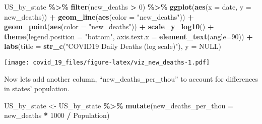 \documentclass[
]{article}
\newenvironment{Shaded}{\begin{snugshade}}{\end{snugshade}}
\newcommand{\AttributeTok}[1]{\textcolor[rgb]{0.13,0.29,0.53}{#1}}
\newcommand{\ConstantTok}[1]{\textcolor[rgb]{0.56,0.35,0.01}{#1}}
\newcommand{\DecValTok}[1]{\textcolor[rgb]{0.00,0.00,0.81}{#1}}
\newcommand{\FunctionTok}[1]{\textcolor[rgb]{0.13,0.29,0.53}{\textbf{#1}}}
\newcommand{\NormalTok}[1]{#1}
\newcommand{\OtherTok}[1]{\textcolor[rgb]{0.56,0.35,0.01}{#1}}
\newcommand{\SpecialCharTok}[1]{\textcolor[rgb]{0.81,0.36,0.00}{\textbf{#1}}}
\newcommand{\StringTok}[1]{\textcolor[rgb]{0.31,0.60,0.02}{#1}}
\begin{document}
\begin{Shaded}
\begin{Highlighting}[]
\NormalTok{US\_by\_state }\SpecialCharTok{\%\textgreater{}\%}
  \FunctionTok{filter}\NormalTok{(new\_deaths }\SpecialCharTok{\textgreater{}} \DecValTok{0}\NormalTok{) }\SpecialCharTok{\%\textgreater{}\%}
  \FunctionTok{ggplot}\NormalTok{(}\FunctionTok{aes}\NormalTok{(}\AttributeTok{x =}\NormalTok{ date, }\AttributeTok{y =}\NormalTok{ new\_deaths)) }\SpecialCharTok{+}
  \FunctionTok{geom\_line}\NormalTok{(}\FunctionTok{aes}\NormalTok{(}\AttributeTok{color =} \StringTok{"new\_deaths"}\NormalTok{)) }\SpecialCharTok{+}
  \FunctionTok{geom\_point}\NormalTok{(}\FunctionTok{aes}\NormalTok{(}\AttributeTok{color =} \StringTok{"new\_deaths"}\NormalTok{)) }\SpecialCharTok{+}
  \FunctionTok{scale\_y\_log10}\NormalTok{() }\SpecialCharTok{+}
  \FunctionTok{theme}\NormalTok{(}\AttributeTok{legend.position =} \StringTok{"bottom"}\NormalTok{, }\AttributeTok{axis.text.x =} \FunctionTok{element\_text}\NormalTok{(}\AttributeTok{angle=}\DecValTok{90}\NormalTok{)) }\SpecialCharTok{+}
  \FunctionTok{labs}\NormalTok{(}\AttributeTok{title =} \FunctionTok{str\_c}\NormalTok{(}\StringTok{"COVID19 Daily Deaths (log scale)"}\NormalTok{), }\AttributeTok{y =} \ConstantTok{NULL}\NormalTok{)}
\end{Highlighting}
\end{Shaded}

\texttt{[image: covid\_19\_files/figure-latex/viz\_new\_deaths-1.pdf]}

Now lets add another column, ``new\_deaths\_per\_thou'' to account for
differences in states' population.

\begin{Shaded}
\begin{Highlighting}[]
\NormalTok{US\_by\_state }\OtherTok{\textless{}{-}}\NormalTok{ US\_by\_state }\SpecialCharTok{\%\textgreater{}\%}
  \FunctionTok{mutate}\NormalTok{(}\AttributeTok{new\_deaths\_per\_thou =}\NormalTok{ new\_deaths }\SpecialCharTok{*} \DecValTok{1000} \SpecialCharTok{/}\NormalTok{ Population)}
\end{Highlighting}
\end{Shaded}
\end{document}
